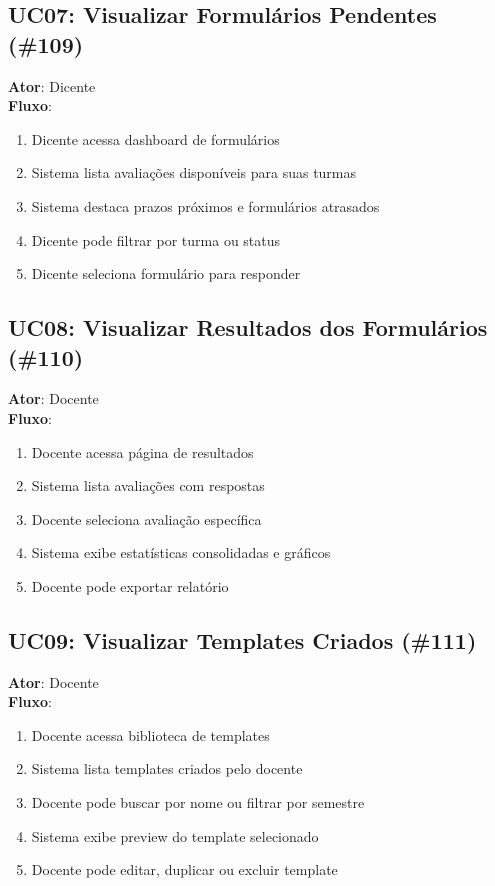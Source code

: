\documentclass[a4paper,12pt]{article}
\begin{document}
\subsection{UC07: Visualizar Formulários Pendentes (\#109)}
\textbf{Ator}: Dicente\\
\textbf{Fluxo}:
\begin{enumerate}
    \item Dicente acessa dashboard de formulários
    \item Sistema lista avaliações disponíveis para suas turmas
    \item Sistema destaca prazos próximos e formulários atrasados
    \item Dicente pode filtrar por turma ou status
    \item Dicente seleciona formulário para responder
\end{enumerate}

\subsection{UC08: Visualizar Resultados dos Formulários (\#110)}
\textbf{Ator}: Docente\\
\textbf{Fluxo}:
\begin{enumerate}
    \item Docente acessa página de resultados
    \item Sistema lista avaliações com respostas
    \item Docente seleciona avaliação específica
    \item Sistema exibe estatísticas consolidadas e gráficos
    \item Docente pode exportar relatório
\end{enumerate}

\subsection{UC09: Visualizar Templates Criados (\#111)}
\textbf{Ator}: Docente\\
\textbf{Fluxo}:
\begin{enumerate}
    \item Docente acessa biblioteca de templates
    \item Sistema lista templates criados pelo docente
    \item Docente pode buscar por nome ou filtrar por semestre
    \item Sistema exibe preview do template selecionado
    \item Docente pode editar, duplicar ou excluir template
\end{enumerate}
\end{document}
